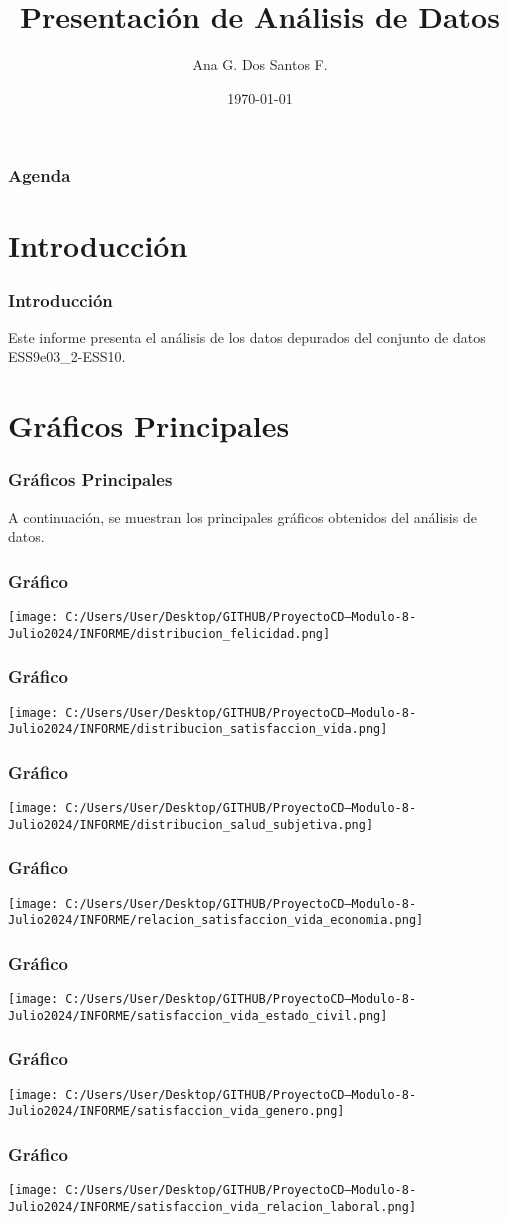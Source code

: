 \documentclass{beamer}\usepackage[]{graphicx}\usepackage[]{xcolor}
\title{Presentación de Análisis de Datos}
\author{Ana G. Dos Santos F.}
\date{\today}
\begin{document}
\begin{frame}
  \titlepage
\end{frame}

\begin{frame}
  \frametitle{Agenda}
  \tableofcontents
\end{frame}

\section{Introducción}
\begin{frame}
  \frametitle{Introducción}
  Este informe presenta el análisis de los datos depurados del conjunto de datos ESS9e03\_2-ESS10.
\end{frame}

\section{Gráficos Principales}
\begin{frame}
  \frametitle{Gráficos Principales}
  A continuación, se muestran los principales gráficos obtenidos del análisis de datos.
\end{frame}



\begin{frame}
\frametitle{Gráfico}
\texttt{[image: C:/Users/User/Desktop/GITHUB/ProyectoCD---Modulo-8-Julio2024/INFORME/distribucion\_felicidad.png]}
\end{frame}
\begin{frame}
\frametitle{Gráfico}
\texttt{[image: C:/Users/User/Desktop/GITHUB/ProyectoCD---Modulo-8-Julio2024/INFORME/distribucion\_satisfaccion\_vida.png]}
\end{frame}
\begin{frame}
\frametitle{Gráfico}
\texttt{[image: C:/Users/User/Desktop/GITHUB/ProyectoCD---Modulo-8-Julio2024/INFORME/distribucion\_salud\_subjetiva.png]}
\end{frame}
\begin{frame}
\frametitle{Gráfico}
\texttt{[image: C:/Users/User/Desktop/GITHUB/ProyectoCD---Modulo-8-Julio2024/INFORME/relacion\_satisfaccion\_vida\_economia.png]}
\end{frame}
\begin{frame}
\frametitle{Gráfico}
\texttt{[image: C:/Users/User/Desktop/GITHUB/ProyectoCD---Modulo-8-Julio2024/INFORME/satisfaccion\_vida\_estado\_civil.png]}
\end{frame}
\begin{frame}
\frametitle{Gráfico}
\texttt{[image: C:/Users/User/Desktop/GITHUB/ProyectoCD---Modulo-8-Julio2024/INFORME/satisfaccion\_vida\_genero.png]}
\end{frame}
\begin{frame}
\frametitle{Gráfico}
\texttt{[image: C:/Users/User/Desktop/GITHUB/ProyectoCD---Modulo-8-Julio2024/INFORME/satisfaccion\_vida\_relacion\_laboral.png]}
\end{frame}
\end{document}
